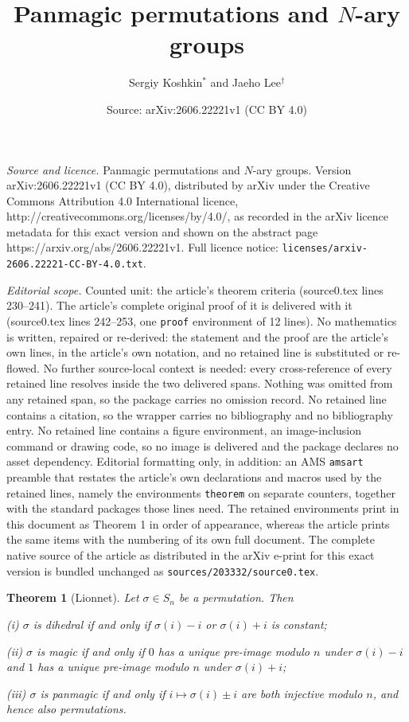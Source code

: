\documentclass[10pt,a4paper]{amsart}
\title{Panmagic permutations and $N$-ary groups}
\author{Sergiy Koshkin$^*$ and Jaeho Lee$^\dagger$}
\date{Source: arXiv:2606.22221v1 (CC BY 4.0)}
\newtheorem{theorem}{Theorem}
\def\s{{\sigma}}
\begin{document}
\maketitle

\noindent\emph{Source and licence.} Panmagic permutations and $N$-ary groups. Version arXiv:2606.22221v1 (CC BY 4.0), distributed by arXiv under the Creative Commons Attribution 4.0 International licence, http://creativecommons.org/licenses/by/4.0/, as recorded in the arXiv licence metadata for this exact version and shown on the abstract page https://arxiv.org/abs/2606.22221v1. Full licence notice: \texttt{licenses/arxiv-2606.22221-CC-BY-4.0.txt}.\par\smallskip

\noindent\textit{Editorial scope.} Counted unit: the article's theorem criteria (source0.tex lines 230--241). The article's complete original proof of it is delivered with it (source0.tex lines 242--253, one \texttt{proof} environment of 12 lines). No mathematics is written, repaired or re-derived: the statement and the proof are the article's own lines, in the article's own notation, and no retained line is substituted or re-flowed.  No further source-local context is needed: every cross-reference of every retained line resolves inside the two delivered spans.  Nothing was omitted from any retained span, so the package carries no omission record.  No retained line contains a citation, so the wrapper carries no bibliography and no bibliography entry.  No retained line contains a figure environment, an image-inclusion command or drawing code, so no image is delivered and the package declares no asset dependency.  Editorial formatting only, in addition: an AMS \texttt{amsart} preamble that restates the article's own declarations and macros used by the retained lines, namely the environments \texttt{theorem} on separate counters, together with the standard packages those lines need.  The retained environments print in this document as Theorem 1 in order of appearance, whereas the article prints the same items with the numbering of its own full document.  The complete native source of the article as distributed in the arXiv e-print for this exact version is bundled unchanged as \texttt{sources/203332/source0.tex}.
\begin{theorem}[Lionnet]\label{pmagic criteria} Let $\s\in S_n$ be a permutation. Then
\medskip

\noindent\textup{(i)} $\s$ is dihedral if and only if $\sigma(i)-i$ or $\sigma(i)+i$ is constant;
\medskip

\noindent\textup{(ii)} $\s$ is magic if and only if  $0$ has a unique pre-image modulo $n$ under $\sigma(i)-i$ and $1$ has a unique pre-image modulo $n$ under $\sigma(i)+i$;
\medskip

\noindent\textup{(iii)} 
$\s$ is panmagic if and only if $i\mapsto\sigma(i)\pm i$ are both injective modulo $n$, and hence also permutations. 
\end{theorem}
\end{document}
